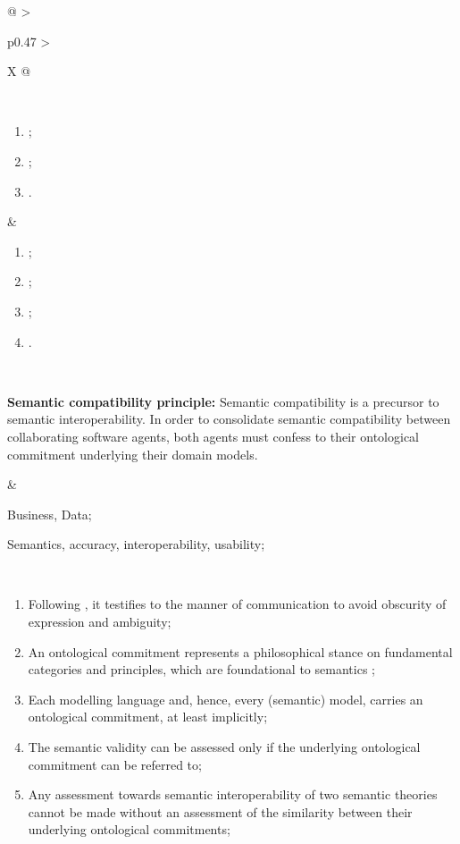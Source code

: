\begin{xltabular}[l]{\linewidth}{@{} >{\small\raggedright\arraybackslash}p{0.47\linewidth} >{\small\raggedright\arraybackslash}X @{}}
\begin{description}[labelwidth=3.7cm,leftmargin=3.7cm+1ex,nosep,topsep=2ex,labelsep=1ex,font=\bfseries]
\end{description} \\
\begin{enumerate}[left=6pt, nosep]
  \item ;
  \item ;
  \item .
\end{enumerate}
&
\begin{enumerate}[left=10pt, nosep]
  \item ;
  \item ;
  \item ;
  \item .
\end{enumerate} \\
%
%
%
\begin{mmdp}\label{dp:scp}{\bfseries Semantic compatibility principle:}
\quad Semantic compatibility is a precursor to semantic interoperability. In order to consolidate semantic compatibility between collaborating software agents, both agents must confess to their ontological commitment underlying their domain models.\end{mmdp} 
&
\begin{description}[labelwidth=3.7cm,leftmargin=3.7cm+1ex,nosep,topsep=2ex,labelsep=1ex,font=\bfseries]
\item[Type of information:] Business, Data;
\item[Quality attributes:] Semantics, accuracy, interoperability, usability;
\end{description} \\
\begin{enumerate}[left=6pt, nosep]
  \item Following \cite{Grice:1991BT}, it testifies to the manner of communication to avoid obscurity of expression and ambiguity;
  \item An ontological commitment represents a philosophical stance on fundamental categories and principles, which are foundational to semantics \cite[sec.3.1]{Brandt2021a};
  \item Each modelling language and, hence, every (semantic) model, carries an ontological commitment, at least implicitly;
  \item The semantic validity can be assessed only if the underlying ontological commitment can be referred to;
  \item Any assessment towards semantic interoperability of two semantic theories cannot be made without an assessment of the similarity between their underlying ontological commitments;

\end{enumerate}
\end{xltabular}
